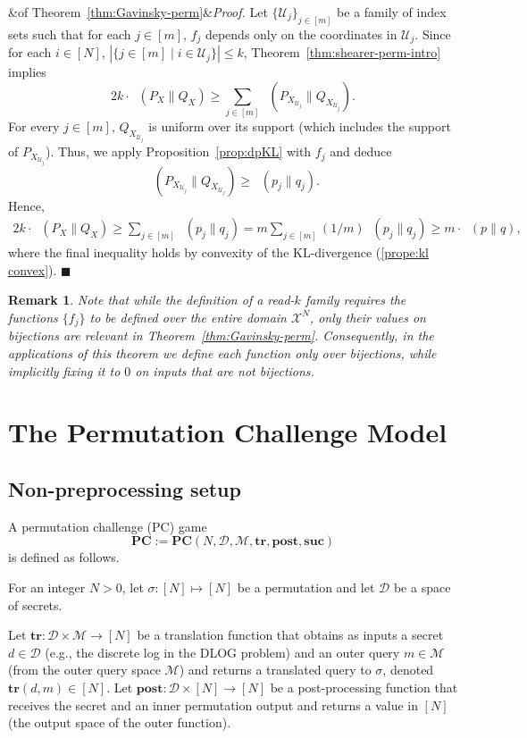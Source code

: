 \documentclass[11pt]{article}
\renewenvironment{proof}[1][]
    {\noindent
       \ifx&#1&{\it Proof.}
       \else{\it Proof ({#1}).}
       \fi}{\hfill $\blacksquare$}
\newtheorem{remark}[theorem]{Remark}
\DeclareMathOperator{\KL}{D_{\text{KL}}}
\newcommand{\SECS}{{\mathcal{D}}}
\newcommand{\secv}{{d}}
\newcommand{\SUC}{\boldsymbol{suc}}
\newcommand{\TR}{\boldsymbol{tr}}
\newcommand{\POST}{\boldsymbol{post}}
\newcommand{\PC}{\boldsymbol{PC}}
\begin{document}
\medskip

\begin{proof}[of Theorem~\ref{thm:Gavinsky-perm}]
Let $\{\mathcal{U}_j \}_{j \in [m]}$ be a family of index sets such that for each $j \in [m]$, $f_j$ depends only on the coordinates in $\mathcal{U}_j$. Since for each 
$i \in [N]$, $|\{ j \in [m] \mid i \in \mathcal{U}_{j} \} | \leq k$, Theorem~\ref{thm:shearer-perm-intro} implies
$$2k \cdot  \KL( P_X \| Q_X ) \geq \sum_{j \in [m]} \KL( P_{X_{\mathcal{U}_j}} \| Q_{X_{\mathcal{U}_j}} ).$$
For every $j \in [m]$, $Q_{X_{\mathcal{U}_j}}$ is uniform over its support (which includes the support of $P_{X_{\mathcal{U}_j}}$).
Thus, we apply Proposition~\ref{prop:dpKL} with $f_j$ and deduce 
$$\KL( P_{X_{\mathcal{U}_j}} \| Q_{X_{\mathcal{U}_j}} ) \geq \KL( p_j \| q_j ).$$
Hence, 
\begin{align*}
2k \cdot  \KL( P_X \| Q_X ) 
\geq  \sum_{j \in [m]} \KL( p_j \| q_j ) 
= m \sum_{j \in [m]} (1/m) \KL( p_j \| q_j ) 
\geq  m \cdot \KL( p \| q ),
\end{align*}
where the final inequality holds by convexity of the KL-divergence (\ref{prope:kl convex}).
\end{proof}

\begin{remark}
Note that while the definition of a read-$k$ family requires the functions $\{f_j\}$ to be defined over the entire domain 
$\mathcal{X}^N$, only their values on bijections are relevant in Theorem~\ref{thm:Gavinsky-perm}. Consequently, in the applications of this theorem we define each function only over bijections, while implicitly fixing it to $0$ on inputs that are not bijections. 
\end{remark}

\section{The Permutation Challenge Model}
\label{sec:PC}

\subsection{Non-preprocessing setup} 

A permutation challenge (PC) game  
$$\PC := \PC(N,\SECS,\mathcal{M},\TR,\POST,\SUC)$$
is defined as follows. 

For an integer $N > 0$, let $\sigma:[N] \mapsto [N]$ be a permutation and let $\SECS$ be a space of secrets.

Let $\TR:\SECS \times \mathcal{M} \rightarrow [N]$ be a translation function that obtains 
as inputs a secret $\secv \in \SECS$ (e.g., the discrete log in the DLOG problem) and an outer query $m \in \mathcal{M}$ (from the outer query space $\mathcal{M}$) and returns
a translated query to $\sigma$, denoted $\TR(\secv,m) \in [N]$.
Let $\POST: \SECS \times [N] \rightarrow [N]$ be a post-processing function that receives the secret and an inner permutation output and returns a value in $[N]$ (the output space of the outer function).
\end{document}
